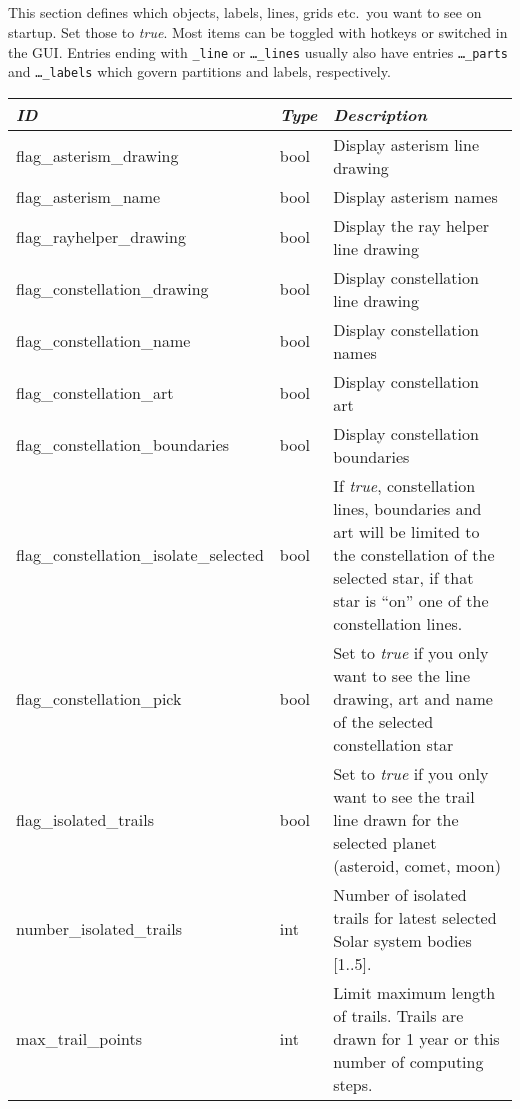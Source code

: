 \subsection{}

This section defines which objects, labels, lines, grids etc.\ you
want to see on startup. Set those to \emph{true}. Most items can be
toggled with hotkeys or switched in the GUI. Entries ending with
\texttt{\_line} or \texttt{\ldots\_lines} usually also have entries
\texttt{\ldots\_parts} and \texttt{\ldots\_labels} which govern
partitions and labels, respectively.

\begin{longtable}{l|l|p{77mm}}
\toprule
\emph{ID} & \emph{Type} & \emph{Description}\\\midrule
flag\_asterism\_drawing         & bool  & Display asterism line drawing\\%
flag\_asterism\_name            & bool  & Display asterism names\\%
flag\_rayhelper\_drawing        & bool  & Display the ray helper line drawing\\%
flag\_constellation\_drawing    & bool  & Display constellation line drawing\\%
flag\_constellation\_name       & bool  & Display constellation names\\%
flag\_constellation\_art        & bool  & Display constellation art\\%
flag\_constellation\_boundaries & bool  & Display constellation boundaries \\%
flag\_constellation\_isolate\_selected  & bool & If \emph{true}, constellation lines, boundaries and art will be limited to the constellation of the selected star, 
                                                 if that star is ``on'' one of the constellation lines.\\%
flag\_constellation\_pick     & bool & Set to \emph{true} if you only want to see the line drawing, art and name of the selected constellation star\\\midrule
%
flag\_isolated\_trails        & bool & Set to \emph{true} if you only want to see the trail line drawn for the selected planet (asteroid, comet, moon)\\%
number\_isolated\_trails      & int  & Number of isolated trails for latest selected Solar system bodies [1..5].\\%
max\_trail\_points            & int  & Limit maximum length of trails. Trails are drawn for 1 year or this number of computing steps.

\end{longtable}

